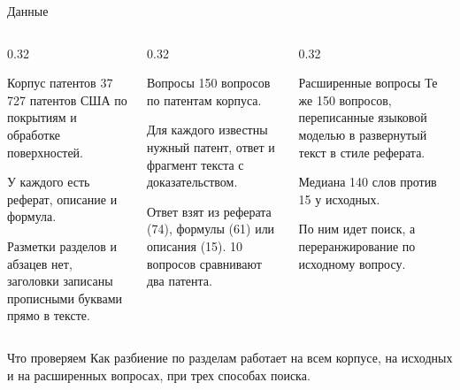 \documentclass[aspectratio=169]{beamer}
\begin{document}
\begin{frame}{Данные}
    \footnotesize
    \begin{columns}[T]
        \begin{column}{0.32\textwidth}
            \begin{block}{Корпус патентов}
                37\,727 патентов США по покрытиям и обработке поверхностей.
                \medskip

                У каждого есть реферат, описание и формула.
                \medskip

                Разметки разделов и абзацев нет, заголовки записаны прописными буквами прямо в тексте.
            \end{block}
        \end{column}
        \begin{column}{0.32\textwidth}
            \begin{block}{Вопросы}
                150 вопросов по патентам корпуса.
                \medskip

                Для каждого известны нужный патент, ответ и фрагмент текста с доказательством.
                \medskip

                Ответ взят из реферата (74), формулы (61) или описания (15). 10 вопросов сравнивают два патента.
            \end{block}
        \end{column}
        \begin{column}{0.32\textwidth}
            \begin{block}{Расширенные вопросы}
                Те же 150 вопросов, переписанные языковой моделью в развернутый текст в стиле реферата.
                \medskip

                Медиана 140 слов против 15 у исходных.
                \medskip

                По ним идет поиск, а переранжирование по исходному вопросу.
            \end{block}
        \end{column}
    \end{columns}

    \bigskip
    \begin{alertblock}{Что проверяем}
        Как разбиение по разделам работает на всем корпусе, на исходных и на расширенных вопросах, при трех способах поиска.
    \end{alertblock}
\end{frame}
\end{document}
